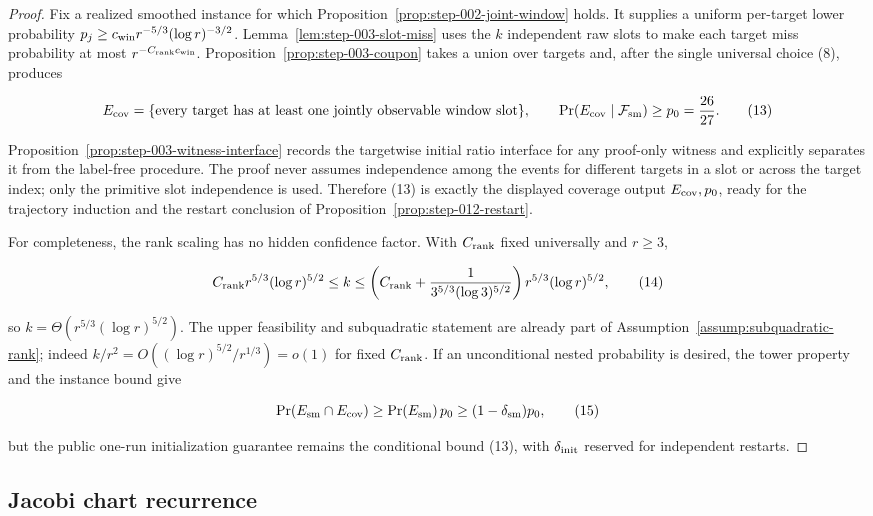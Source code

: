 \begin{proof}
Fix a realized smoothed instance for which
Proposition~\ref{prop:step-002-joint-window} holds. It supplies a uniform
per-target lower probability \(p_j\ge c_{\rm win}r^{-5/3}(\log r)^{-3/2}\).
Lemma~\ref{lem:step-003-slot-miss} uses the \(k\) independent raw slots to
make each target miss probability at most \(r^{-C_{\rm rank}c_{\rm win}}\).
Proposition~\ref{prop:step-003-coupon} takes a union over targets and, after
the single universal choice (8), produces

\[
E_{\rm cov}=\{\text{every target has at least one jointly observable
window slot}\},\qquad
\Pr(E_{\rm cov}\mid\mathcal F_{\rm sm})\ge p_0={26\over27}.
\tag{13}
\]

Proposition~\ref{prop:step-003-witness-interface} records the targetwise initial
ratio interface for any proof-only witness and explicitly separates it from
the label-free procedure. The proof never assumes independence among the
events for different targets in a slot or across the target index; only the
primitive slot independence is used. Therefore (13) is exactly the
displayed coverage output \(E_{\rm cov},p_0\), ready for the trajectory
induction and the restart conclusion of Proposition~\ref{prop:step-012-restart}.

For completeness, the rank scaling has no hidden confidence factor. With
\(C_{\rm rank}\) fixed universally and \(r\ge3\),

\[
C_{\rm rank}r^{5/3}(\log r)^{5/2}\le k
\le\left(C_{\rm rank}+{1\over3^{5/3}(\log3)^{5/2}}\right)
 r^{5/3}(\log r)^{5/2},
\tag{14}
\]

so \(k=\Theta(r^{5/3}(\log r)^{5/2})\). The upper feasibility and
subquadratic statement are already part of Assumption~\ref{assump:subquadratic-rank};
indeed \(k/r^2=O((\log r)^{5/2}/r^{1/3})=o(1)\) for fixed
\(C_{\rm rank}\). If an unconditional nested probability is desired, the
tower property and the instance bound give

\[
\Pr(E_{\rm sm}\cap E_{\rm cov})\ge
\Pr(E_{\rm sm})\,p_0\ge(1-\delta_{\rm sm})p_0,
\tag{15}
\]

but the public one-run initialization guarantee remains the
conditional bound (13), with \(\delta_{\rm init}\) reserved for independent
restarts.
\end{proof}

\subsection{Jacobi chart recurrence}\label{app:step-004}

